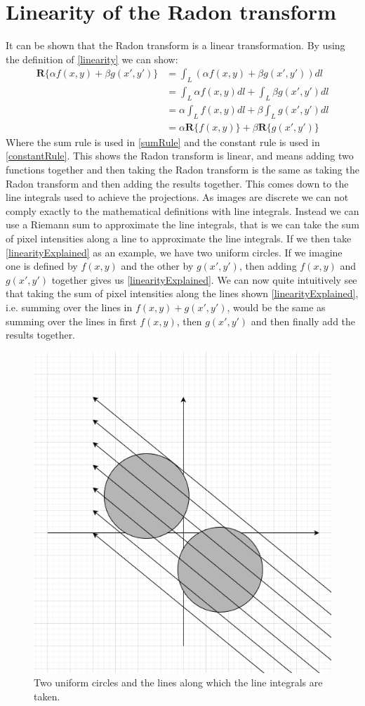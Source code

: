 \section{Linearity of the Radon transform}
It can be shown that the Radon transform is a linear transformation. By using the definition of \autoref{linearity} we can show:
\begin{align}
	\mathbf{R}\{\alpha f(x,y) + \beta g(x',y')\} &= \int_L \left(\alpha f(x,y) + \beta g(x',y')\right) dl\\
	&= \int_L \alpha f(x,y) dl + \int_L \beta g(x',y') dl \label{sumRule}\\
	&= \alpha \int_L f(x,y) dl + \beta \int_L g(x',y') dl \label{constantRule}\\
	&= \alpha \mathbf{R}\{f(x,y)\} + \beta \mathbf{R}\{g(x',y')\}
\end{align}
Where the sum rule is used in \autoref{sumRule} and the constant rule is used in \autoref{constantRule}. This shows the Radon transform is linear, and means adding two functions together and then taking the Radon transform is the same as taking the Radon transform and then adding the results together. This comes down to the line integrals used to achieve the projections. As images are discrete we can not comply exactly to the mathematical definitions with line integrals. Instead we can use a Riemann sum to approximate the line integrals, that is we can take the sum of pixel intensities along a line to approximate the line integrals. If we then take \autoref{linearityExplained} as an example, we have two uniform circles. If we imagine one is defined by $f(x,y)$ and the other by $g(x',y')$, then adding $f(x,y)$ and $g(x',y')$ together gives us \autoref{linearityExplained}. We can now quite intuitively see that taking the sum of pixel intensities along the lines shown \autoref{linearityExplained}, i.e. summing over the lines in $f(x,y) + g(x',y')$, would be the same as summing over the lines in first $f(x,y)$, then $g(x',y')$ and then finally add the results together.
\begin{figure}
	\centering
	\includegraphics[width=\linewidth]{Materials/linearityExplained}
	\caption{Two uniform circles and the lines along which the line integrals are taken.}
	\label{linearityExplained}
\end{figure}